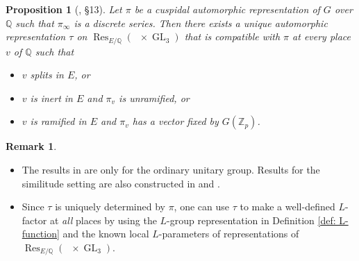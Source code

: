 \documentclass[11pt, a4paper]{amsart}
\theoremstyle{plain}
\newtheorem{proposition}[theorem]{Proposition}
\theoremstyle{definition}
\newtheorem{remark}[theorem]{Remark}
\numberwithin{equation}{section}
\def\QQ{\mathbb{Q}}
\def\ZZ{\mathbb{Z}}
\DeclareMathOperator{\Res}{Res}
\DeclareMathOperator{\GL}{\mathrm{GL}}
\DeclareMathOperator{\Gm}{\mathrm{G_{m}}}
\newcommand{\Zp}{\ZZ_p}
\begin{document}
\begin{proposition}[\cite{Roga90}, \S 13]
\label{Prop: twisted base change}
    Let $\pi$ be a cuspidal automorphic representation of $G$ over $\QQ$ such that $\pi_{\infty}$ is a discrete series. Then there exists a unique automorphic representation $\tau$ on $\Res_{E/\QQ}(\Gm \times \GL_3)$ that is compatible with $\pi$ at every place $v$ of $\QQ$ such that 
    \begin{itemize}
        \item $v$ splits in $E$, or
        \item $v$ is inert in $E$ and $\pi_v$ is unramified, or 
        \item $v$ is ramified in $E$ and $\pi_ v$ has a vector fixed by $G(\Zp)$. 
    \end{itemize}
\end{proposition}
\begin{remark}
    \begin{itemize}
        \item  The results in \cite{Roga90} are only for the ordinary unitary group. Results for the similitude setting are also constructed in \cite{Morel_Coh10} and \cite{Shin_BC14}. 
        \item Since $\tau$ is uniquely determined by $\pi$, one can use $\tau$ to make a well-defined $L$-factor at \textit{all} places by using the $L$-group representation in Definition \ref{def: L-function} and the known local $L$-parameters of representations of $\Res_{E/\QQ}(\Gm \times \GL_3)$. 
    \end{itemize}
\end{remark}
\end{document}
